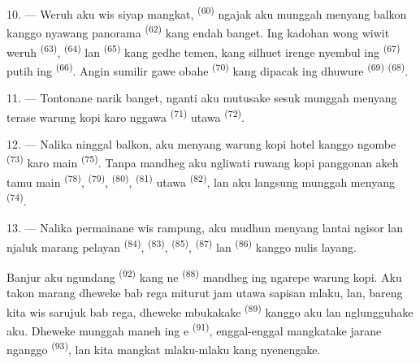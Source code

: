 10. --- Weruh aku wis siyap mangkat, 
\textsuperscript{(60)} ngajak aku munggah menyang balkon kanggo
nyawang panorama  \textsuperscript{(62)} kang endah
banget. Ing kadohan wong wiwit weruh 
\textsuperscript{(63)},  \textsuperscript{(64)} lan
 \textsuperscript{(65)} kang gedhe temen, kang silhuet
irenge nyembul ing  \textsuperscript{(67)} putih ing
 \textsuperscript{(66)}. Angin sumilir gawe obahe
 \textsuperscript{(70)} kang dipacak ing dhuwure
 \textsuperscript{(69)} 
\textsuperscript{(68)}.

\VUsaut{3.0mm}
\VUsaut{3.0mm}

11. --- Tontonane narik banget, nganti aku mutusake sesuk munggah
menyang terase warung kopi karo nggawa 
\textsuperscript{(71)} utawa  \textsuperscript{(72)}.

12. --- Nalika ninggal balkon, aku menyang warung kopi hotel kanggo
ngombe  \textsuperscript{(73)} karo main
 \textsuperscript{(75)}. Tanpa mandheg aku ngliwati
ruwang kopi panggonan akeh tamu main 
\textsuperscript{(78)},  \textsuperscript{(79)},
 \textsuperscript{(80)}, 
\textsuperscript{(81)} utawa  \textsuperscript{(82)}, lan
aku langsung munggah menyang  \textsuperscript{(74)}.

13. --- Nalika permainane wis rampung, aku mudhun menyang lantai ngisor
lan njaluk marang pelayan  \textsuperscript{(84)},
 \textsuperscript{(83)}, 
\textsuperscript{(85)},  \textsuperscript{(87)} lan
 \textsuperscript{(86)} kanggo nulis layang.

Banjur aku ngundang  \textsuperscript{(92)} kang
ne \textsuperscript{(88)} mandheg ing ngarepe warung kopi.
Aku takon marang dheweke bab rega miturut jam utawa sapisan mlaku, lan,
bareng kita wis sarujuk bab rega, dheweke mbukakake  \textsuperscript{(89)} kanggo aku lan nglungguhake aku. Dheweke
munggah maneh ing e \textsuperscript{(91)}, enggal-enggal
mangkatake jarane nganggo  \textsuperscript{(93)}, lan
kita mangkat mlaku-mlaku kang nyenengake.

\VUsaut{6.0mm}
\VUfilet{22mm}
